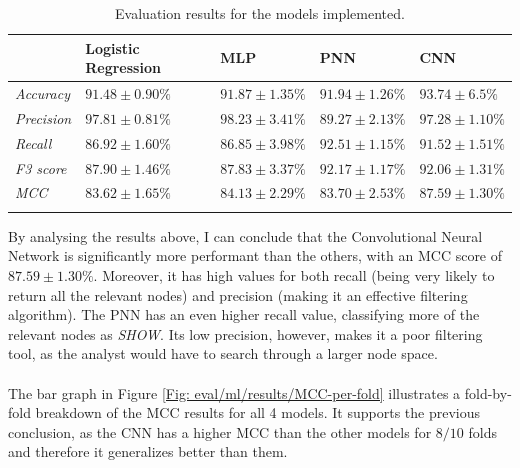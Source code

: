 		\begin{longtable}{|p{}|p{}|p{}|p{}|p{}|}
			\hline
			& \textbf{Logistic Regression} & \textbf{MLP} & \textbf{PNN} &  \textbf{CNN}\\
			\hline
			\textit{Accuracy} & $91.48 \pm 0.90 \%$ &$91.87 \pm 1.35 \%$  &  $91.94 \pm 1.26 \%$ &\cellcolor{green!50}  $\mathbf{93.74 \pm 6.5 \%}$ \\
			\hline
			\textit{Precision} & $97.81 \pm 0.81\%$& $98.23 \pm 3.41 \%$ &   $89.27 \pm 2.13 \%$ & \cellcolor{green!50} $\mathbf{97.28 \pm 1.10 \%}$  \\
			\hline
			\textit{Recall} & $86.92 \pm 1.60\%$& $86.85 \pm 3.98 \%$ & $92.51 \pm 1.15 \%$ & \cellcolor{green!50} $\mathbf{91.52 \pm 1.51 \%}$  \\
			\hline
			\textit{F3 score} & $87.90 \pm 1.46 \%$ & $87.83 \pm 3.37 \%$  &  $92.17 \pm 1.17 \%$ & \cellcolor{green!50} $\mathbf{92.06 \pm 1.31 \%}$\\
			\hline
			\textit{MCC} & $83.62 \pm 1.65\%$& $84.13 \pm 2.29 \%$ &  $83.70 \pm 2.53 \%$ & \cellcolor{green!50} $\mathbf{87.59 \pm 1.30 \%}$\\
			\hline
			\caption{Evaluation results for the models implemented.}
			\label{Table: eval/models/results/overall}
		\end{longtable}
		By analysing the results above, I can conclude that the Convolutional Neural Network is significantly more performant than the others, with an MCC score of $\mathbf{87.59 \pm 1.30 \%}$. Moreover, it has high values for both recall (being very likely to return all the relevant nodes) and precision (making it an effective filtering algorithm). The PNN has an even higher recall value, classifying more of the relevant nodes as \textit{SHOW}. Its low precision, however, makes it a poor filtering tool, as the analyst would have to search through a larger node space.
		\\ \\
		The bar graph in Figure \ref{Fig: eval/ml/results/MCC-per-fold} illustrates a fold-by-fold breakdown of the MCC results for all 4 models. It supports the previous conclusion, as the CNN has a higher MCC than the other models for $8/10$ folds and therefore it generalizes better than them.    
